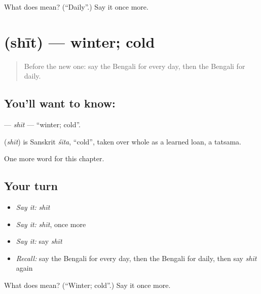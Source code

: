 \begin{tcolorbox}[breakable,colback=teal!4,colframe=teal!35!black,title={Before you move on}]
What does  mean? (\textquotedblleft{}Daily\textquotedblright{}.) Say it once more.
\end{tcolorbox}
\section[\texorpdfstring{\bn{শীত} (shīt)}{শীত (shīt)}]{ (shīt) — winter; cold}

\label{lesson:BN-C92-shit}



\begin{quote}
Before the new one: say the Bengali for every day, then the Bengali for daily.
\end{quote}

\subsection*{You'll want to know: }
\textbf{} — \emph{shīt} — \textquotedblleft{}winter; cold\textquotedblright{}.

\begin{cousinweb}
\textbf{} (\emph{shīt}) is Sanskrit \emph{śīta}, \textquotedblleft{}cold\textquotedblright{}, taken over whole as a learned loan, a tatsama.
\end{cousinweb}

\begin{grammarlens}[title={What you've built}]
One more word for this chapter.
\end{grammarlens}

\subsection*{Your turn}
\begin{itemize}
\raggedright
  \item \emph{Say it:} \emph{shīt}
  \item \emph{Say it:} \emph{shīt}, once more
  \item \emph{Say it:} say \emph{shīt}
  \item \emph{Recall:} say the Bengali for every day, then the Bengali for daily, then say \emph{shīt} again
\end{itemize}

\begin{tcolorbox}[breakable,colback=teal!4,colframe=teal!35!black,title={Before you move on}]
What does  mean? (\textquotedblleft{}Winter; cold\textquotedblright{}.) Say it once more.
\end{tcolorbox}
